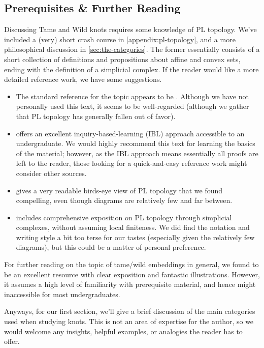 \subsection*{Prerequisites \& Further Reading}\label{subsec:further-reading}
Discussing Tame and Wild knots requires some knowledge of PL topology.
We've included a (very) short crash course in
\cref{appendix:pl-topology}, and a more philosophical discussion in
\cref{sec:the-categories}. The former essentially consists of a short
collection of definitions and propositions about affine and convex
sets, ending with the definition of a simplicial complex. If the
reader would like a more detailed reference work, we have some
suggestions.
\begin{itemize}
  \item The standard reference for the topic appears to be
    \cite{Rourke1982}. Although we have not personally used this text,
    it seems to be well-regarded (although we gather that PL topology
    has generally fallen out of favor).
  \item \cite{StarbirdAndSu} offers an excellent
    inquiry-based-learning (IBL) approach accessible to an
    undergraduate. We would highly recommend this text for learning
    the basics of the material; however, as the IBL approach means
    essentially all proofs are left to the reader, those looking for a
    quick-and-easy reference work might consider other sources.
  \item \cite{Bryant2001Jan} gives a very readable birds-eye view
    of PL topology that we found compelling, even though diagrams are
    relatively few and far between.
  \item \cite{Sakai2013} includes comprehensive exposition on
    PL topology through simplicial complexes, without assuming local
    finiteness. We did find the notation and writing style a bit too
    terse for our tastes (especially given the relatively few
    diagrams), but this could be a matter of personal preference.
\end{itemize}
For further reading on the topic of tame/wild embeddings in general,
we found \cite{Daverman} to be an excellent resource with clear
exposition and fantastic illustrations. However, it assumes a high
level of familiarity with prerequisite material, and hence might
inaccessible for most undergraduates.

Anyways, for our first section, we'll give a brief discussion of the
main categories used when studying knots. This is not an area of
expertise for the author, so we would welcome any insights, helpful
examples, or analogies the reader has to offer.

